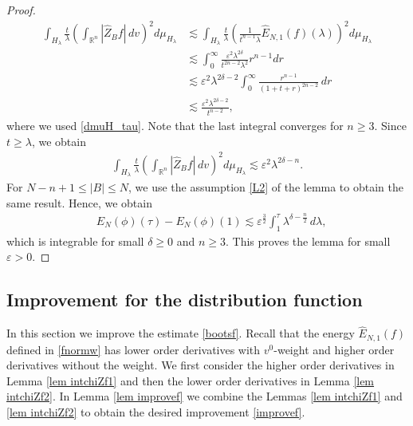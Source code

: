 \documentclass{article}
\newcommand{\bbr}{{\mathbb R}}
\newcommand{\bbrn}{{\bbr^n}}
\begin{document}
\begin{proof}
\begin{align*}
\int_{ H_\lambda } \frac{ t }{ \lambda } \left( \int_\bbrn | \hat{ Z }_B f | \, d v \right)^2 d \mu_{ H_\lambda } & \lesssim \int_{ H_\lambda } \frac{ t }{ \lambda } \left( \frac{ 1 }{ t^{ n - 1 } \lambda } \hat{ E }_{ N , 1 } ( f ) ( \lambda ) \right)^2 d \mu_{ H_\lambda } \\
& \lesssim \int_0^\infty \frac{ \varepsilon^2 \lambda^{ 2 \delta } }{ t^{ 2 n - 2 } \lambda^2 } r^{ n - 1 } d r \\
& \lesssim \varepsilon^2 \lambda^{ 2 \delta - 2 } \int_0^\infty \frac{ r^{ n - 1 } }{ ( 1 + t + r )^{ 2 n - 2 } } \, d r \\
& \lesssim \frac{ \varepsilon^2 \lambda^{ 2 \delta - 2 } }{ t^{ n - 2 } } ,
\end{align*}
where we used \eqref{dmuH_tau}. Note that the last integral converges for $ n \geq 3 $. Since $ t \geq \lambda $, we obtain
\begin{align*}
\int_{ H_\lambda } \frac{ t }{ \lambda } \left( \int_\bbrn | \hat{ Z }_B f | \, dv \right)^2 d \mu_{ H_\lambda } \lesssim \varepsilon^2 \lambda^{ 2 \delta - n } .
\end{align*}
For $ N - n + 1 \leq | B | \leq N $, we use the assumption \eqref{L2} of the lemma to obtain the same result. Hence, we obtain
\begin{align*}
& E_N ( \phi ) ( \tau ) - E_N ( \phi ) ( 1 ) \lesssim \varepsilon^{ \frac32 } \int_1^\tau \lambda^{ \delta - \frac{ n }{ 2 } } \, d \lambda ,
\end{align*}
which is integrable for small $ \delta \geq 0 $ and $ n \geq 3 $. This proves the lemma for small $ \varepsilon > 0 $.
\end{proof}





%
\subsection{Improvement for the distribution function} \label{sec improvef}
In this section we improve the estimate \eqref{bootsf}. Recall that the energy $ \hat{ E }_{ N , 1 } ( f ) $ defined in \eqref{fnormw} has lower order derivatives with $ v^0 $-weight and higher order derivatives without the weight. We first consider the higher order derivatives in Lemma \ref{lem intchiZf1} and then the lower order derivatives in Lemma \ref{lem intchiZf2}. In Lemma \ref{lem improvef} we combine the Lemmas \ref{lem intchiZf1} and \ref{lem intchiZf2} to obtain the desired improvement \eqref{improvef}.
\end{document}
